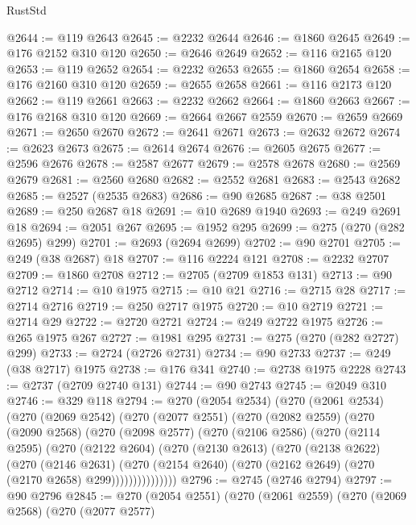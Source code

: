 \begin{lexlean}{RustStd}
\begin{coremodule}
@2644 := @119 @2643
@2645 := @2232 @2644
@2646 := @1860 @2645
@2649 := @176 @2152 @310 @120
@2650 := @2646 @2649
@2652 := @116 @2165 @120
@2653 := @119 @2652
@2654 := @2232 @2653
@2655 := @1860 @2654
@2658 := @176 @2160 @310 @120
@2659 := @2655 @2658
@2661 := @116 @2173 @120
@2662 := @119 @2661
@2663 := @2232 @2662
@2664 := @1860 @2663
@2667 := @176 @2168 @310 @120
@2669 := @2664 @2667 @2559
@2670 := @2659 @2669
@2671 := @2650 @2670
@2672 := @2641 @2671
@2673 := @2632 @2672
@2674 := @2623 @2673
@2675 := @2614 @2674
@2676 := @2605 @2675
@2677 := @2596 @2676
@2678 := @2587 @2677
@2679 := @2578 @2678
@2680 := @2569 @2679
@2681 := @2560 @2680
@2682 := @2552 @2681
@2683 := @2543 @2682
@2685 := @2527 (@2535 @2683)
@2686 := @90 @2685
@2687 := @38 @2501
@2689 := @250 @2687 @18
@2691 := @10 @2689 @1940
@2693 := @249 @2691 @18
@2694 := @2051 @267
@2695 := @1952 @295
@2699 := @275 (@270 (@282 @2695) @299)
@2701 := @2693 (@2694 @2699)
@2702 := @90 @2701
@2705 := @249 (@38 @2687) @18
@2707 := @116 @2224 @121
@2708 := @2232 @2707
@2709 := @1860 @2708
@2712 := @2705 (@2709 @1853 @131)
@2713 := @90 @2712
@2714 := @10 @1975
@2715 := @10 @21
@2716 := @2715 @28
@2717 := @2714 @2716
@2719 := @250 @2717 @1975
@2720 := @10 @2719
@2721 := @2714 @29
@2722 := @2720 @2721
@2724 := @249 @2722 @1975
@2726 := @265 @1975 @267
@2727 := @1981 @295
@2731 := @275 (@270 (@282 @2727) @299)
@2733 := @2724 (@2726 @2731)
@2734 := @90 @2733
@2737 := @249 (@38 @2717) @1975
@2738 := @176 @341
@2740 := @2738 @1975 @2228
@2743 := @2737 (@2709 @2740 @131)
@2744 := @90 @2743
@2745 := @2049 @310
@2746 := @329 @118
@2794 := @270
    (@2054 @2534)
    (@270
      (@2061 @2534)
      (@270
        (@2069 @2542)
        (@270
          (@2077 @2551)
          (@270
            (@2082 @2559)
            (@270
              (@2090 @2568)
              (@270
                (@2098 @2577)
                (@270
                  (@2106 @2586)
                  (@270
                    (@2114 @2595)
                    (@270
                      (@2122 @2604)
                      (@270
                        (@2130 @2613)
                        (@270
                          (@2138 @2622)
                          (@270
                            (@2146 @2631)
                            (@270
                              (@2154 @2640)
                              (@270 (@2162 @2649) (@270 (@2170 @2658) @299)))))))))))))))
@2796 := @2745 (@2746 @2794)
@2797 := @90 @2796
@2845 := @270
    (@2054 @2551)
    (@270
      (@2061 @2559)
      (@270
        (@2069 @2568)
        (@270
          (@2077 @2577)

\end{coremodule}
\end{lexlean}
